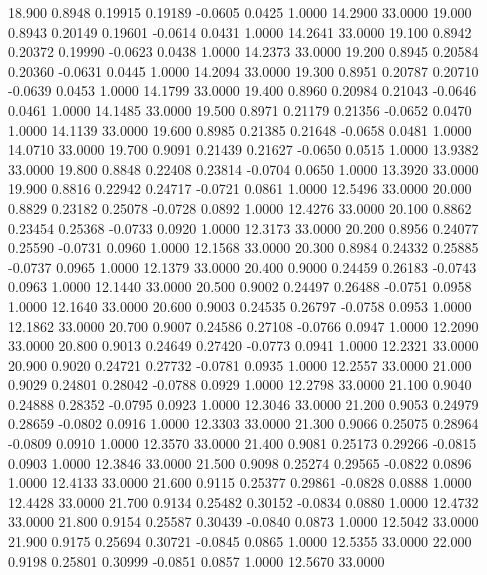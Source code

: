  18.900   0.8948   0.19915   0.19189  -0.0605   0.0425   1.0000  14.2900  33.0000
  19.000   0.8943   0.20149   0.19601  -0.0614   0.0431   1.0000  14.2641  33.0000
  19.100   0.8942   0.20372   0.19990  -0.0623   0.0438   1.0000  14.2373  33.0000
  19.200   0.8945   0.20584   0.20360  -0.0631   0.0445   1.0000  14.2094  33.0000
  19.300   0.8951   0.20787   0.20710  -0.0639   0.0453   1.0000  14.1799  33.0000
  19.400   0.8960   0.20984   0.21043  -0.0646   0.0461   1.0000  14.1485  33.0000
  19.500   0.8971   0.21179   0.21356  -0.0652   0.0470   1.0000  14.1139  33.0000
  19.600   0.8985   0.21385   0.21648  -0.0658   0.0481   1.0000  14.0710  33.0000
  19.700   0.9091   0.21439   0.21627  -0.0650   0.0515   1.0000  13.9382  33.0000
  19.800   0.8848   0.22408   0.23814  -0.0704   0.0650   1.0000  13.3920  33.0000
  19.900   0.8816   0.22942   0.24717  -0.0721   0.0861   1.0000  12.5496  33.0000
  20.000   0.8829   0.23182   0.25078  -0.0728   0.0892   1.0000  12.4276  33.0000
  20.100   0.8862   0.23454   0.25368  -0.0733   0.0920   1.0000  12.3173  33.0000
  20.200   0.8956   0.24077   0.25590  -0.0731   0.0960   1.0000  12.1568  33.0000
  20.300   0.8984   0.24332   0.25885  -0.0737   0.0965   1.0000  12.1379  33.0000
  20.400   0.9000   0.24459   0.26183  -0.0743   0.0963   1.0000  12.1440  33.0000
  20.500   0.9002   0.24497   0.26488  -0.0751   0.0958   1.0000  12.1640  33.0000
  20.600   0.9003   0.24535   0.26797  -0.0758   0.0953   1.0000  12.1862  33.0000
  20.700   0.9007   0.24586   0.27108  -0.0766   0.0947   1.0000  12.2090  33.0000
  20.800   0.9013   0.24649   0.27420  -0.0773   0.0941   1.0000  12.2321  33.0000
  20.900   0.9020   0.24721   0.27732  -0.0781   0.0935   1.0000  12.2557  33.0000
  21.000   0.9029   0.24801   0.28042  -0.0788   0.0929   1.0000  12.2798  33.0000
  21.100   0.9040   0.24888   0.28352  -0.0795   0.0923   1.0000  12.3046  33.0000
  21.200   0.9053   0.24979   0.28659  -0.0802   0.0916   1.0000  12.3303  33.0000
  21.300   0.9066   0.25075   0.28964  -0.0809   0.0910   1.0000  12.3570  33.0000
  21.400   0.9081   0.25173   0.29266  -0.0815   0.0903   1.0000  12.3846  33.0000
  21.500   0.9098   0.25274   0.29565  -0.0822   0.0896   1.0000  12.4133  33.0000
  21.600   0.9115   0.25377   0.29861  -0.0828   0.0888   1.0000  12.4428  33.0000
  21.700   0.9134   0.25482   0.30152  -0.0834   0.0880   1.0000  12.4732  33.0000
  21.800   0.9154   0.25587   0.30439  -0.0840   0.0873   1.0000  12.5042  33.0000
  21.900   0.9175   0.25694   0.30721  -0.0845   0.0865   1.0000  12.5355  33.0000
  22.000   0.9198   0.25801   0.30999  -0.0851   0.0857   1.0000  12.5670  33.0000
